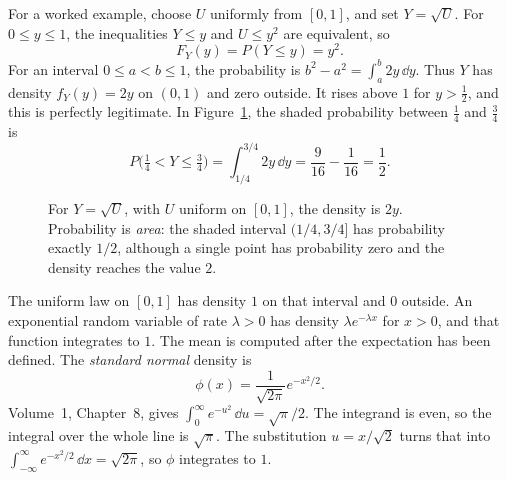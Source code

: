 For a worked example, choose $U$ uniformly from $[0,1]$, and set $Y=\sqrt U$. For $0\le y\le1$, the inequalities $Y\le y$ and $U\le y^2$ are equivalent, so
\[
 F_Y(y)=P(Y\le y)=y^2.
\]
For an interval $0\le a<b\le1$, the probability is $b^2-a^2=\int_a^b 2y\,\dd y$. Thus $Y$ has density $f_Y(y)=2y$ on $(0,1)$ and zero outside. It rises above $1$ for $y>\frac12$, and this is perfectly legitimate. In Figure~\ref{fig:densityarea}, the shaded probability between $\frac14$ and $\frac34$ is
\[
 P\bigl(\tfrac14<Y\le\tfrac34\bigr)
 =\int_{1/4}^{3/4}2y\,\dd y
 =\frac9{16}-\frac1{16}=\frac12.
\]

\begin{figure}[ht]
\centering
{}
\caption{For $Y=\sqrt U$, with $U$ uniform on $[0,1]$, the density is $2y$. Probability is \emph{area}: the shaded interval $(1/4,3/4]$ has probability exactly $1/2$, although a single point has probability zero and the density reaches the value $2$.}
\label{fig:densityarea}
\end{figure}

The uniform law on $[0,1]$ has density $1$ on that interval and $0$ outside. An exponential random variable of rate $\lambda>0$ has density $\lambda e^{-\lambda x}$ for $x>0$, and that function integrates to $1$. The mean is computed after the expectation has been defined. The \emph{standard normal} density is
\[
 \phi(x)=\frac{1}{\sqrt{2\pi}}e^{-x^2/2}.
\]
Volume~1, Chapter~8, gives $\int_0^{\infty}e^{-u^2}\,\dd u=\sqrt{\pi}/2$. The integrand is even, so the integral over the whole line is $\sqrt{\pi}$. The substitution $u=x/\sqrt{2}$ turns that into $\int_{-\infty}^{\infty}e^{-x^2/2}\,\dd x=\sqrt{2\pi}$, so $\phi$ integrates to $1$.

